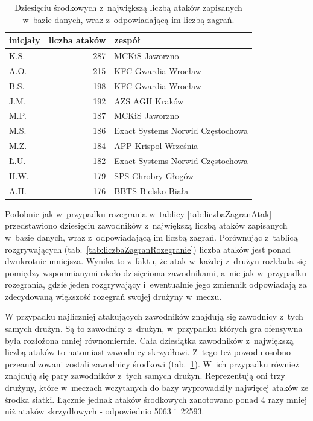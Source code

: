 \documentclass[a4paper,twoside,12pt]{book}
\begin{document}
\begin{table}
\centering
\caption{Dziesięciu środkowych z~największą liczbą ataków zapisanych w~bazie danych, wraz z~odpowiadającą im liczbą zagrań.}
\label{tab:liczbaZagranAtakSrodkowi}
\begin{tabular}{lrl}
\toprule
{inicjały} & {liczba ataków} & {zespół} \\
\midrule
K.S. & 287 & MCKiS Jaworzno \\ 
A.O. & 215 & KFC Gwardia Wrocław \\ 
B.S. & 198 & KFC Gwardia Wrocław \\ 
J.M. & 192 & AZS AGH Kraków \\
M.P. & 187 & MCKiS Jaworzno \\ 
M.S. & 186 & Exact Systems Norwid Częstochowa \\ 
M.Z. & 184 & APP Krispol Września \\ 
Ł.U. & 182 & Exact Systems Norwid Częstochowa \\
H.W. & 179 & SPS Chrobry Głogów \\ 
A.H. & 176 & BBTS Bielsko-Biała \\
\bottomrule
\end{tabular}
\end{table}

Podobnie jak w~przypadku rozegrania w~tablicy \ref{tab:liczbaZagranAtak} przedstawiono dziesięciu zawodników z~największą liczbą ataków zapisanych w~bazie danych, wraz z~odpowiadającą im liczbą zagrań. Porównując z~tablicą rozgrywających (tab.~\ref{tab:liczbaZagranRozegranie}) liczba ataków jest ponad dwukrotnie mniejsza. Wynika to z~faktu, że atak w~każdej z~drużyn rozkłada się pomiędzy wspomnianymi około dzisięcioma zawodnikami, a~nie jak w~przypadku rozegrania, gdzie jeden rozgrywający i~ewentualnie jego zmiennik odpowiadają za zdecydowaną większość rozegrań swojej drużyny w~meczu. 

W przypadku najliczniej atakujących zawodników znajdują się zawodnicy z~tych samych drużyn. Są to zawodnicy z~drużyn, w~przypadku których gra ofensywna była rozłożona mniej równomiernie. Cała dziesiątka zawodników z~największą liczbą ataków to natomiast zawodnicy skrzydłowi. Z~tego też powodu osobno przeanalizowani zostali zawodnicy środkowi (tab.~\ref{tab:liczbaZagranAtakSrodkowi}). W~ich przypadku również znajdują się pary zawodników z~tych samych drużyn. Reprezentują oni trzy drużyny, które w~meczach wczytanych do bazy wyprowadziły najwięcej ataków ze środka siatki. Łącznie jednak ataków środkowych zanotowano ponad 4 razy mniej niż ataków skrzydłowych - odpowiednio 5063 i~22593.
\end{document}
